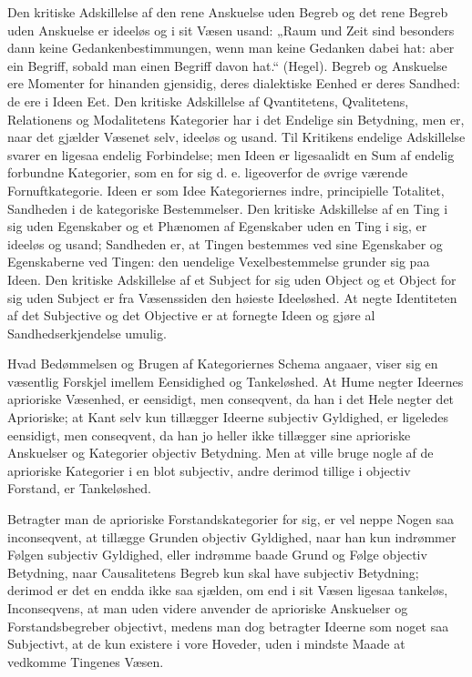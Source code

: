\documentclass[12pt]{book}
\newcommand{\opage}[1]{\marginnote{\footnotesize\textit{[#1]}}}
\begin{document}
Den kritiske Adskillelse af den rene Anskuelse uden Begreb og det rene Begreb uden Anskuelse er
ideeløs og i sit Væsen usand: „Raum und Zeit sind besonders dann keine Gedankenbestimmungen, wenn
man keine Gedanken dabei hat: aber ein Begriff, sobald man einen Begriff davon hat.“ (Hegel).
Begreb og Anskuelse ere Momenter for hinanden gjensidig, deres dialektiske Eenhed er deres Sandhed:
de ere i Ideen Eet. Den kritiske Adskillelse af Qvantitetens, Qvalitetens, Relationens og
Modalitetens Kategorier har i det Endelige sin Betydning, men er, naar det gjælder Væsenet selv,
ideeløs og usand. Til Kritikens endelige Adskillelse svarer en ligesaa endelig Forbindelse; men Ideen
er ligesaalidt en Sum af endelig forbundne Kategorier, som en for sig d. e. ligeoverfor de øvrige
værende Fornuftkategorie. Ideen er som Idee Kategoriernes indre, principielle Totalitet, Sandheden i
de kategoriske Bestemmelser. Den kritiske Adskillelse af en Ting i sig uden Egenskaber og et Phænomen
af Egenskaber uden en Ting i sig, er ideeløs og usand; Sandheden er, at Tingen bestemmes ved sine
Egenskaber og Egenskaberne ved Tingen: den uendelige Vexelbestemmelse
\opage{182} grunder sig paa Ideen. Den kritiske Adskillelse af et Subject for sig uden Object og et Object for
sig uden Subject er fra Væsenssiden den høieste Ideeløshed. At negte Identiteten af det Subjective og
det Objective er at fornegte Ideen og gjøre al Sandhedserkjendelse umulig.

Hvad Bedømmelsen og Brugen af Kategoriernes Schema angaaer, viser sig en væsentlig Forskjel imellem
Eensidighed og Tankeløshed. At Hume negter Ideernes aprioriske Væsenhed, er eensidigt, men
conseqvent, da han i det Hele negter det Aprioriske; at Kant selv kun tillægger Ideerne subjectiv
Gyldighed, er ligeledes eensidigt, men conseqvent, da han jo heller ikke tillægger sine aprioriske
Anskuelser og Kategorier objectiv Betydning. Men at ville bruge nogle af de aprioriske Kategorier i
en blot subjectiv, andre derimod tillige i objectiv Forstand, er Tankeløshed.

Betragter man de aprioriske Forstandskategorier for sig, er vel neppe Nogen saa inconseqvent, at
tillægge Grunden objectiv Gyldighed, naar han kun indrømmer Følgen subjectiv Gyldighed, eller
indrømme baade Grund og Følge objectiv Betydning, naar Causalitetens Begreb kun skal have subjectiv
Betydning; derimod er det en endda ikke saa sjælden, om end i sit Væsen ligesaa tankeløs,
Inconseqvens, at man uden videre anvender de aprioriske Anskuelser og Forstandsbegreber objectivt,
medens man dog betragter Ideerne som noget saa Subjectivt, at de kun existere i vore Hoveder, uden i
mindste Maade at vedkomme Tingenes Væsen.
\end{document}
